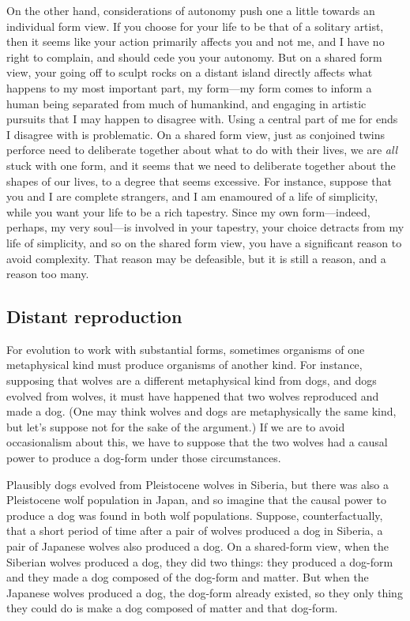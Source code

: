 On the other hand, considerations of autonomy push one a little towards an individual form view.
If you choose for your life to be that of a solitary artist, then it seems like your action 
primarily affects you and not me, and I have no right to complain, and should cede you your
autonomy. But on a shared form view, your going off to sculpt rocks on a distant island directly affects
what happens to my most important part, my form---my form comes to inform a human being separated
from much of humankind, and engaging in artistic pursuits that I may happen to disagree with. Using 
a central part of me for ends I disagree with is problematic. On a shared form view, just as conjoined
twins perforce need to deliberate together about what to do with their lives, we are \textit{all} stuck with
one form, and it seems that we need to deliberate together about the shapes of our lives, to a degree
that seems excessive. For instance, suppose that you and I are complete strangers, and I am enamoured of 
a life of simplicity, while you want
your life to be a rich tapestry. Since my own form---indeed, perhaps, my very soul---is involved in your
tapestry, your choice detracts from my life of simplicity, and so on the shared form view, you have a significant 
reason to avoid complexity. That reason may be defeasible, but it is still a reason, and a reason too many. 

\subsection{Distant reproduction}
For evolution to
work with substantial forms, sometimes organisms of one metaphysical
kind must produce organisms of another kind. For instance, supposing
that wolves are a different metaphysical kind from dogs, and dogs
evolved from wolves, it must have happened that two wolves reproduced
and made a dog. (One may think wolves and dogs are metaphysically the same
kind, but let's suppose not for the sake of the argument.) If we
are to avoid occasionalism about this, we have to suppose that the two
wolves had a causal power to produce a dog-form under those
circumstances.

Plausibly dogs evolved from Pleistocene wolves in Siberia, but there was also a
Pleistocene wolf population in Japan, and so imagine that the causal power
to produce a dog was found in both wolf populations. Suppose,
counterfactually, that a short period of time after a pair of wolves
produced a dog in Siberia, a pair of Japanese wolves also produced a
dog. On a shared-form view, when the Siberian wolves produced a dog,
they did two things: they produced a dog-form and they made a dog
composed of the dog-form and matter. But when the Japanese wolves
produced a dog, the dog-form already existed, so they only thing they
could do is make a dog composed of matter and that dog-form.

